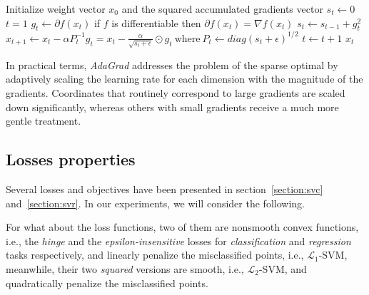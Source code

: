 \begin{algorithm}[H]
	\caption{AdaGrad}
	\label{alg:adagrad}
	\begin{algorithmic}
			\State Initialize weight vector $x_0$ and the squared accumulated gradients vector $s_t \gets 0$
			\State $t = 1$
				\State $g_t \gets \partial f(x_t)$ \Comment if $f$ is differentiable then $\partial f(x_t) = \nabla f(x_t)$
				\State $s_t \gets s_{t-1} + g_t^2$
				\State $x_{t+1} \gets x_t - \alpha P_t^{-1} g_t = x_t - \displaystyle \frac{\alpha}{\sqrt{s_t + \epsilon}} \odot g_t \ \text{where} \ P_t \gets diag(s_t + \epsilon)^{1/2}$
				\State $t \gets t + 1$
			\EndWhile
			\State \Return $x_t$
		\EndFunction
	\end{algorithmic}
\end{algorithm}

In practical terms, \emph{AdaGrad} addresses the problem of the sparse optimal by adaptively scaling the learning rate for each dimension with the magnitude of the gradients. Coordinates that routinely correspond to large gradients are scaled down significantly, whereas others with small gradients receive a much more gentle treatment.

\pagebreak

\subsection{Losses properties}

Several losses and objectives have been presented in section~\ref{section:svc} and~\ref{section:svr}. In our experiments, we will consider the following.

For what about the loss functions, two of them are nonsmooth convex functions, i.e., the \emph{hinge} and the \emph{epsilon-insensitive} losses for \emph{classification} and \emph{regression} tasks respectively, and linearly penalize the misclassified points, i.e., $\mathcal{L}_1$-SVM, meanwhile, their two \emph{squared} versions are smooth, i.e., $\mathcal{L}_2$-SVM, and quadratically penalize the misclassified points.



